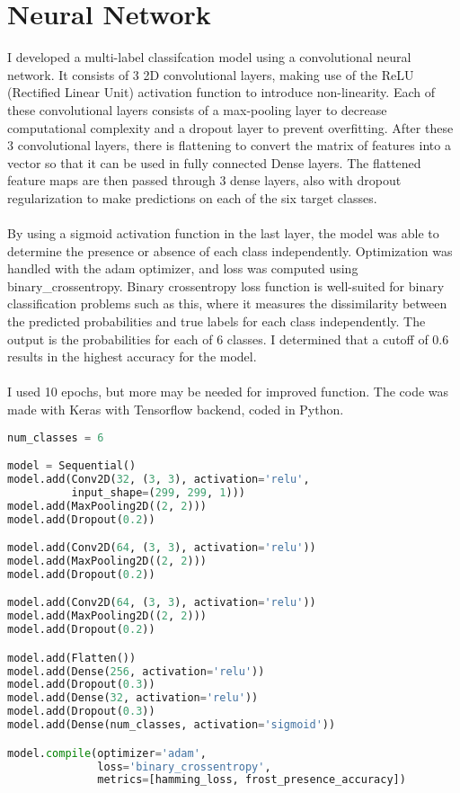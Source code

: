 \documentclass[11pt]{article}
\begin{document}
\section{Neural Network}
I developed a multi-label classifcation model using a convolutional neural network. It consists of 3 2D convolutional layers, making use of the ReLU (Rectified Linear Unit) activation function to introduce non-linearity. Each of these convolutional layers consists of a max-pooling layer to decrease computational complexity and a dropout layer to prevent overfitting. After these 3 convolutional layers, there is flattening to convert the matrix of features into a vector so that it can be used in fully connected Dense layers. The flattened feature maps are then passed through 3 dense layers, also with dropout regularization to make predictions on each of the six target classes.\\\\
By using a sigmoid activation function in the last layer, the model was able to determine the presence or absence of each class independently. Optimization was handled with the adam optimizer, and loss was computed using binary\_crossentropy. Binary crossentropy loss function is well-suited for binary classification problems such as this, where it measures the dissimilarity between the predicted probabilities and true labels for each class independently. The output is the probabilities for each of 6 classes. I determined that a cutoff of 0.6 results in the highest accuracy for the model.\\\\
I used 10 epochs, but more may be needed for improved function. The code was made with Keras with Tensorflow backend, coded in Python.\pagebreak
\begin{lstlisting}[language=Python, caption=CNN]
num_classes = 6

model = Sequential()
model.add(Conv2D(32, (3, 3), activation='relu',
          input_shape=(299, 299, 1)))
model.add(MaxPooling2D((2, 2)))
model.add(Dropout(0.2))

model.add(Conv2D(64, (3, 3), activation='relu'))
model.add(MaxPooling2D((2, 2)))
model.add(Dropout(0.2))

model.add(Conv2D(64, (3, 3), activation='relu'))
model.add(MaxPooling2D((2, 2)))
model.add(Dropout(0.2))

model.add(Flatten())
model.add(Dense(256, activation='relu'))
model.add(Dropout(0.3))
model.add(Dense(32, activation='relu'))
model.add(Dropout(0.3))
model.add(Dense(num_classes, activation='sigmoid'))

model.compile(optimizer='adam',
              loss='binary_crossentropy',
              metrics=[hamming_loss, frost_presence_accuracy])
\end{lstlisting}
\end{document}
